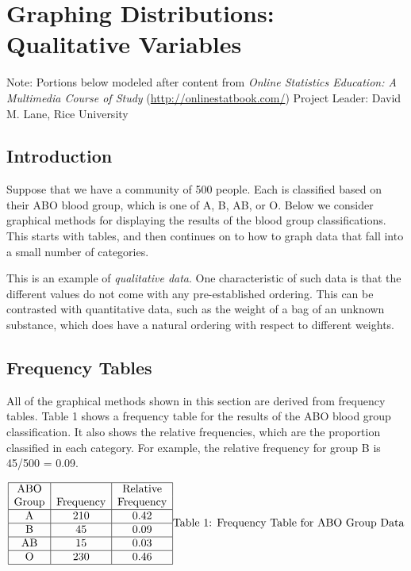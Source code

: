 \documentclass[
]{book}
\begin{document}
\hypertarget{graphing-distributions-qualitative-variables}{%
\chapter{Graphing Distributions: Qualitative Variables}\label{graphing-distributions-qualitative-variables}}

Note: Portions below modeled after content from
\emph{Online Statistics Education: A Multimedia Course of Study}
(\url{http://onlinestatbook.com/}) Project Leader: David M. Lane, Rice University

\hypertarget{introduction}{%
\section{Introduction}\label{introduction}}

Suppose that we have a community of 500 people. Each is classified based on
their ABO blood group, which is one of A, B, AB, or O. Below we consider
graphical methods for displaying the results of the blood group classifications.
This starts with tables, and then continues on to how to graph data that
fall into a small number of categories.

This is an example of \emph{qualitative data}. One characteristic of such data is
that the different values do not come with any pre-established ordering.
This can be contrasted with quantitative data, such as the weight of a bag of an
unknown substance, which does have a natural ordering with respect to
different weights.

\hypertarget{frequency-tables}{%
\section{Frequency Tables}\label{frequency-tables}}

All of the graphical methods shown in this section are derived from frequency
tables. Table 1 shows a frequency table for the results of the ABO blood group
classification. It also shows the
relative frequencies, which are the proportion classified in each category.
For example, the relative frequency for group B is 45/500 = 0.09.

\[
\begin{array}{|c|c|c|} \hline
\mathrm{ABO} & & \mathrm{Relative} \\
\mathrm{Group} & \mathrm{Frequency} & \mathrm{Frequency} \\ \hline
\mathrm{A} & 210 & 0.42 \\  \hline
\mathrm{B} & 45  & 0.09 \\  \hline
\mathrm{AB} & 15 & 0.03 \\  \hline
\mathrm{O} & 230 & 0.46 \\  \hline
\end{array}\\
\mbox{Table 1: Frequency Table for ABO Group Data}
\]
\end{document}
